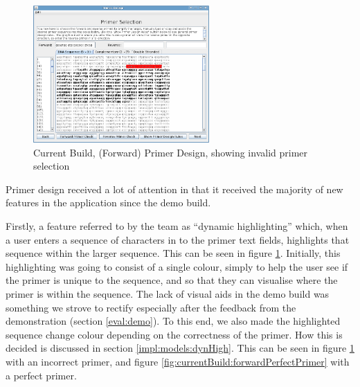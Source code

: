 \begin{figure}[!t]
  \begin{center}
    \includegraphics[width=0.6\textwidth]{./images/currentBuild/forwardPrimerDesignRed.png}
    \caption{
      \label{fig:currentBuild:forwardPrimerDesignRed}
      Current Build, (Forward) Primer Design, showing invalid primer selection
    }
  \end{center}
\end{figure}

Primer design received a lot of attention in that it received the
majority of new features in the application since the demo build.

Firstly, a feature referred to by the team as ``dynamic highlighting''
which, when a user enters a sequence of characters in to the primer
text fields, highlights that sequence within the larger sequence.
This can be seen in figure
\ref{fig:currentBuild:forwardPrimerDesignRed}.
Initially, this highlighting was going to consist of a single colour, 
simply to help the user see if the primer is unique to the sequence, 
and so that they can visualise where the primer is within the sequence.
The lack of visual aids in the demo build was something we strove to
rectify especially after the feedback from the demonstration (section
\ref{eval:demo}).
To this end, we also made the highlighted sequence change colour depending 
on the correctness of the primer. How this is decided is discussed in 
section \ref{impl:models:dynHigh}.
This can be seen in figure \ref{fig:currentBuild:forwardPrimerDesignRed} 
with an incorrect primer, and figure \ref{fig:currentBuild:forwardPerfectPrimer} 
with a perfect primer.


